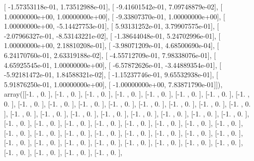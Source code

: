 \documentclass{article}
\begin{document}
       [ -1.57353118e-01,   1.73512988e-01],
       [ -9.41601542e-01,   7.09748879e-02],
       [  1.00000000e+00,   1.00000000e+00],
       [ -9.33807370e-01,   1.00000000e+00],
       [  1.00000000e+00,  -5.14427753e-01],
       [  5.93131252e-01,   3.79907575e-01],
       [ -2.07966327e-01,  -8.53143221e-02],
       [ -1.38644048e-01,   5.24702996e-01],
       [  1.00000000e+00,   2.18810208e-01],
       [ -3.98071209e-01,   4.68500690e-04],
       [  6.24170760e-01,   2.63319188e-02],
       [ -4.55712709e-01,   7.98338076e-01],
       [  4.65925545e-01,   1.00000000e+00],
       [ -6.57872626e-01,  -3.44889354e-01],
       [ -5.92181472e-01,   1.84588321e-02],
       [ -1.15237746e-01,   9.65532938e-01],
       [  5.91876250e-01,   1.00000000e+00],
       [ -1.00000000e+00,   7.83871790e-01]]), array([[-1.        ,  0.        ],
       [-1.        ,  0.        ],
       [-1.        ,  0.        ],
       [-1.        ,  0.        ],
       [-1.        ,  0.        ],
       [-1.        ,  0.        ],
       [-1.        ,  0.        ],
       [-1.        ,  0.        ],
       [-1.        ,  0.        ],
       [-1.        ,  0.        ],
       [-1.        ,  0.        ],
       [-1.        ,  0.        ],
       [-1.        ,  0.        ],
       [-1.        ,  0.        ],
       [-1.        ,  0.        ],
       [-1.        ,  0.        ],
       [-1.        ,  0.        ],
       [-1.        ,  0.        ],
       [-1.        ,  0.        ],
       [-1.        ,  0.        ],
       [-1.        ,  0.        ],
       [-1.        ,  0.        ],
       [-1.        ,  0.        ],
       [-1.        ,  0.        ],
       [-1.        ,  0.        ],
       [-1.        ,  0.        ],
       [-1.        ,  0.        ],
       [-1.        ,  0.        ],
       [-1.        ,  0.        ],
       [-1.        ,  0.        ],
       [-1.        ,  0.        ],
       [-1.        ,  0.        ],
       [-1.        ,  0.        ],
       [-1.        ,  0.        ],
       [-1.        ,  0.        ],
       [-1.        ,  0.        ],
       [-1.        ,  0.        ],
       [-1.        ,  0.        ],
       [-1.        ,  0.        ],
       [-1.        ,  0.        ],
       [-1.        ,  0.        ],
       [-1.        ,  0.        ],
       [-1.        ,  0.        ],
       [-1.        ,  0.        ],
       [-1.        ,  0.        ],
       [-1.        ,  0.        ],
       [-1.        ,  0.        ],
       [-1.        ,  0.        ],
       [-1.        ,  0.        ],
       [-1.        ,  0.        ],
       [-1.        ,  0.        ],
       [-1.        ,  0.        ],
\end{document}
